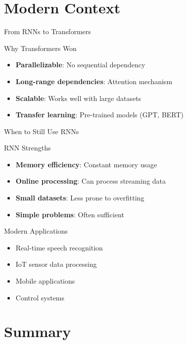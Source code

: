 \documentclass[usenames,dvipsnames]{beamer}
\begin{document}
	\section{Modern Context}
	
	\begin{frame}{From RNNs to Transformers}
		\begin{theorembox}{Why Transformers Won}
			\begin{itemize}
				\item \textbf{Parallelizable}: No sequential dependency
				\item \textbf{Long-range dependencies}: Attention mechanism
				\item \textbf{Scalable}: Works well with large datasets
				\item \textbf{Transfer learning}: Pre-trained models (GPT, BERT)
			\end{itemize}
		\end{theorembox}
	\end{frame}
	
	\begin{frame}{When to Still Use RNNs}
		\begin{definitionbox}{RNN Strengths}
			\begin{itemize}
				\item \textbf{Memory efficiency}: Constant memory usage
				\item \textbf{Online processing}: Can process streaming data
				\item \textbf{Small datasets}: Less prone to overfitting
				\item \textbf{Simple problems}: Often sufficient
			\end{itemize}
		\end{definitionbox}
		
		\begin{examplebox}{Modern Applications}
			\begin{itemize}
				\item Real-time speech recognition
				\item IoT sensor data processing  
				\item Mobile applications
				\item Control systems
			\end{itemize}
		\end{examplebox}
	\end{frame}
	
	\section{Summary}
	
\end{document}

